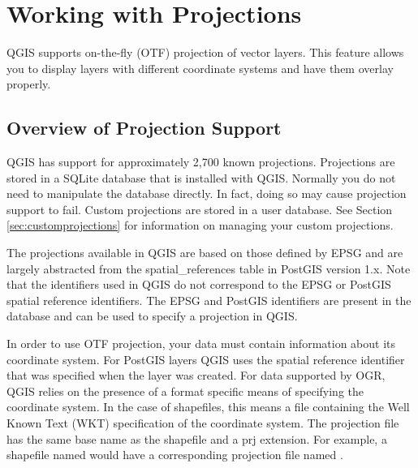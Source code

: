 
\section{Working with Projections}\label{label_projections}

\updatedisclaimer

QGIS supports on-the-fly (OTF) projection of vector layers. This feature allows you
to display layers with different coordinate systems and have them overlay
properly.

\subsection{Overview of Projection Support}\label{label_projoverview}

QGIS has support for approximately 2,700 known projections. 
Projections are stored in a SQLite database that is installed with QGIS.
Normally you do not need to manipulate the database directly. In fact,
doing so may cause projection support to fail. Custom projections are
stored in a user database. See Section \ref{sec:customprojections} for
information on managing your custom projections.

The projections available in QGIS are based on those defined by
EPSG and are
largely abstracted from the spatial\_references table in
PostGIS version 1.x.
Note that the identifiers used in QGIS do not correspond to the EPSG or
PostGIS spatial reference identifiers. The EPSG and PostGIS identifiers are
present in the database and can be used to specify a projection in QGIS.

In order to use OTF projection, your data must contain information about its
coordinate system. For PostGIS layers QGIS uses the spatial reference
identifier that was specified when the layer was created. For data supported
by OGR, QGIS relies on the presence of a format specific means of specifying
the coordinate system. In the case of shapefiles, this means a file containing
the Well Known Text (WKT) specification of the coordinate
system. The
projection file has the same base name as the shapefile and a prj extension.
For example, a shapefile named  would have a corresponding projection
file named .


